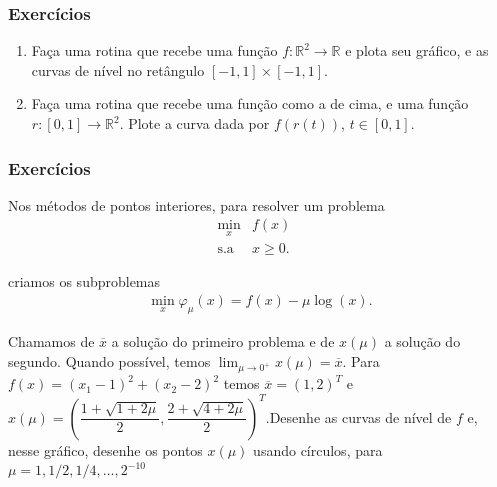 \documentclass{beamer}
\newcommand{\ssiz}{\scriptsize}
\newcommand{\xsol}{\overline{x}}
\newcommand{\xmu}{x(\mu)}
\begin{document}
\begin{frame}
\frametitle{Exerc\'icios}

\begin{enumerate}
\item Fa\c{c}a uma rotina que recebe uma fun\c{c}\~ao $f:\mathbb{R}^2\rightarrow\mathbb{R}$ e plota seu gr\'afico, e as curvas de n\'ivel no ret\^angulo $[-1,1]\times[-1,1]$.
\item Fa\c{c}a uma rotina que recebe uma fun\c{c}\~ao como a de cima, e uma fun\c{c}\~ao $r:[0,1]\rightarrow\mathbb{R}^2$. Plote a curva dada por $f(r(t))$, $t \in [0,1]$.
\end{enumerate}

\end{frame}

\begin{frame}
\frametitle{Exerc\'icios}

\begin{enumerate}
{\ssiz
\setcounter{enumi}{2}
\item Nos m\'etodos de pontos interiores, para resolver um problema
\begin{eqnarray*}
\min_x & f(x)& \\
\mbox{s.a} & x \geq 0. &
\end{eqnarray*}

criamos os subproblemas
\begin{eqnarray*}
\min_x \varphi_{\mu}(x) = f(x) - \mu\log(x).
\end{eqnarray*}

Chamamos de $\xsol$ a solu\c{c}\~ao do primeiro problema e de $\xmu$ a solu\c{c}\~ao do segundo. Quando poss\'ivel, temos $\lim_{\mu\rightarrow0^{+}}\xmu=\xsol$. Para $f(x) = (x_1-1)^2 + (x_2-2)^2$ temos $\xsol = (1,2)^T$ e $\xmu = (\dfrac{1+\sqrt{1+2\mu}}{2},\dfrac{2+\sqrt{4+2\mu}}{2})^T$.Desenhe as curvas de n\'ivel de $f$ e, nesse gr\'afico, desenhe os pontos $\xmu$ usando c\'irculos, para $\mu = 1,1/2,1/4,\dots,2^{-10}$

}
\end{enumerate}

\end{frame}
\end{document}
